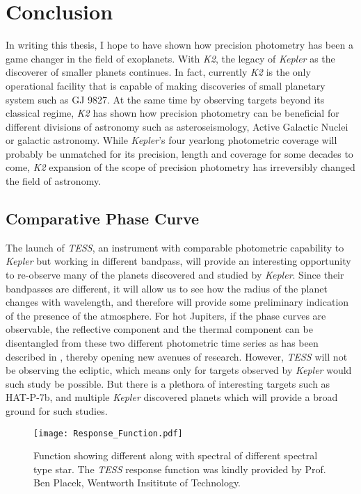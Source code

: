 \chapter{Conclusion}
In writing this thesis, I hope to have shown how precision photometry has been a game changer in the field of exoplanets. With \textit{K2},  the legacy of \textit{Kepler} as the discoverer of smaller planets continues. In fact, currently \textit{K2} is the only operational facility that is capable of making discoveries of small planetary system such as GJ 9827. At the same time by observing targets beyond its classical regime, \textit{K2} has shown how precision photometry can be beneficial for different divisions of astronomy such as asteroseismology, Active Galactic Nuclei or galactic astronomy. While \textit{Kepler}'s four yearlong photometric coverage will probably be unmatched for its precision, length and coverage for some decades to come, \textit{K2} expansion of the scope of precision photometry has irreversibly changed the field of astronomy.

\section{Comparative Phase Curve}
The launch of \textit{TESS}, an instrument with comparable photometric capability to \textit{Kepler} but working in different bandpass, will provide an interesting opportunity to re-observe many of the planets discovered and studied by \textit{Kepler}. Since their bandpasses are different, it will allow us to see how the radius of the planet changes with wavelength, and therefore will provide some preliminary indication of the presence of the atmosphere. For hot Jupiters, if the phase curves are observable, the reflective component and the thermal component can be disentangled from these two different photometric time series as has been described in \citet{placek2016}, thereby opening new avenues of research. However, \textit{TESS} will not be observing the ecliptic, which means only for targets observed by \textit{Kepler} would such study be possible. But there is a plethora of interesting targets such as HAT-P-7b, and multiple \textit{Kepler} discovered planets which will provide a broad ground for such studies.

\begin{figure}[h!]
\centering
\texttt{[image: Response\_Function.pdf]}
\caption{\label{fig:response_function} Function showing different along with spectral of different spectral type star. The \textit{TESS} response function was kindly provided by Prof. Ben Placek, Wentworth Insititute of Technology.}
\end{figure}

